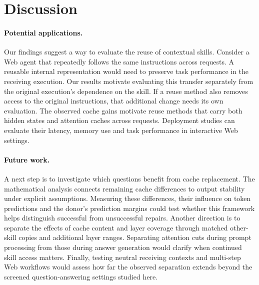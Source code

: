 \section{Discussion}
\label{sec:discussion}

\paragraph{Potential applications.}
Our findings suggest a way to evaluate the reuse of contextual skills.
Consider a Web agent that repeatedly follows the same instructions across
requests. A reusable internal representation would need to preserve task
performance in the receiving execution. Our results motivate evaluating
this transfer separately from the original execution's dependence on the
skill. If a reuse method also removes access to the original instructions,
that additional change needs its own evaluation. The observed cache gains
motivate reuse methods that carry both hidden states and attention caches
across requests. Deployment studies can evaluate their latency, memory
use and task performance in interactive Web settings.

\paragraph{Future work.}
A next step is to investigate which questions benefit from cache
replacement. The mathematical analysis connects remaining cache
differences to output stability under explicit assumptions. Measuring
these differences, their influence on token predictions and the donor's
prediction margins could test whether this framework helps distinguish
successful from unsuccessful repairs. Another direction is to separate
the effects of cache content and layer coverage through matched other-skill
copies and additional layer ranges. Separating attention cuts during prompt
processing from those during answer generation would clarify when continued
skill access matters. Finally,
testing neutral receiving contexts and multi-step Web workflows would
assess how far the observed separation extends beyond the screened
question-answering settings studied here.
